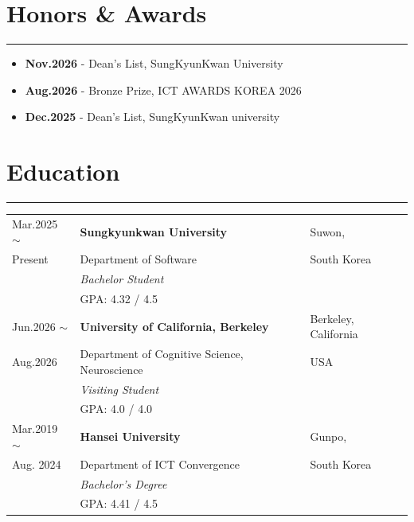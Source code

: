 \documentclass[letterpaper, 10pt]{article}
\begin{document}
\section*{Honors \& Awards}
\hrule
\vspace{8pt}
\begin{itemize}
    \item[] \textbf{Nov.2026} - Dean's List, SungKyunKwan University
    \item[] \textbf{Aug.2026} - Bronze Prize, ICT AWARDS KOREA 2026 
    \item[] \textbf{Dec.2025} - Dean's List, SungKyunKwan university
\end{itemize}
\section*{Education}
\hrule
\vspace{8pt}
\begin{tabularx}{\textwidth}{@{}p{52pt}X>{\raggedleft\arraybackslash}p{128pt}@{}}
    Mar.2025 $\sim$ & \textbf{Sungkyunkwan University}              & Suwon,                \\
    Present         & Department of Software                        & South Korea           \\ [0.5em]
                    & \textit{Bachelor Student}                     &                       \\
                    & GPA: 4.32 / 4.5                               &                       \\ [1em]
    
    Jun.2026 $\sim$ & \textbf{University of California, Berkeley}   & Berkeley, California  \\
    Aug.2026        & Department of Cognitive Science, Neuroscience & USA                   \\ [0.5em]
                    & \textit{Visiting Student}                     &                       \\
                    & GPA: 4.0 / 4.0                                &                       \\ [1em]

    Mar.2019 $\sim$ & \textbf{Hansei University}                    & Gunpo,                \\
    Aug. 2024       & Department of ICT Convergence                 & South Korea           \\ [0.5em]
                    & \textit{Bachelor's Degree}                    &                       \\
                    & GPA: 4.41 / 4.5                               &                       \\
\end{tabularx}
\end{document}
